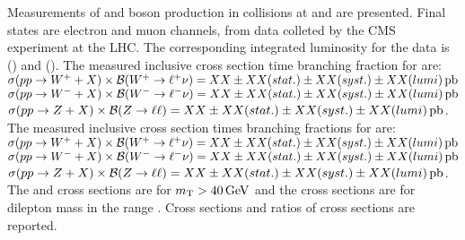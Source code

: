 % 
% 
%
Measurements of \W and \Z boson production in \pp collisions at \serag and \serah are presented. Final states are electron and muon channels, from data colleted by the CMS experiment at the LHC. The corresponding integrated luminosity for the data is \lumig (\serag) and \lumih (\serah). The measured inclusive cross section time branching fraction for \serag are: \\
$\sigma(pp\to W^++X)\times\mathcal{B}(W^+\to \ell^+ \nu) = XX \pm XX (stat.) \pm XX (syst.) \pm XX (lumi) \,\mathrm{pb}$
$\sigma(pp\to W^-+X)\times\mathcal{B}(W^-\to \ell^- \nu) = XX \pm XX (stat.) \pm XX (syst.) \pm XX (lumi) \,\mathrm{pb}$
$\sigma(pp\to Z+X)\times\mathcal{B}(Z\to \ell \ell) = XX \pm XX (stat.) \pm XX (syst.) \pm XX (lumi) \,\mathrm{pb}$. \\
The measured inclusive cross section times branching fractions for \serah are:\\
$\sigma(pp\to W^++X)\times\mathcal{B}(W^+\to \ell^+ \nu) = XX \pm XX (stat.) \pm XX (syst.) \pm XX (lumi) \,\mathrm{pb}$
$\sigma(pp\to W^-+X)\times\mathcal{B}(W^-\to \ell^- \nu) = XX \pm XX (stat.) \pm XX (syst.) \pm XX (lumi) \,\mathrm{pb}$
$\sigma(pp\to Z+X)\times\mathcal{B}(Z\to \ell \ell) = XX \pm XX (stat.) \pm XX (syst.) \pm XX (lumi) \,\mathrm{pb}$. \\
The \Wp and \Wm cross sections are for $m_{\mathrm{T}} > 40 \,\text{Ge\hspace{-.08em}V}$ and the \Z cross sections are for dilepton mass in the range \masswindow. Cross sections and ratios of cross sections are reported. 